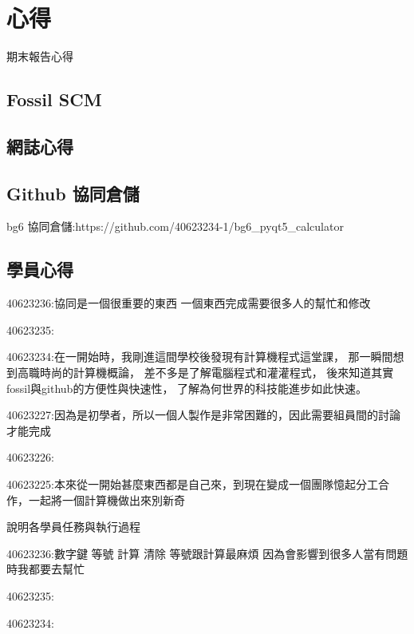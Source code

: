 \documentclass[12pt,,]{report}
\begin{document}
\hypertarget{ux5fc3ux5f97}{%
\chapter{心得}\label{ux5fc3ux5f97}}

期末報告心得

\hypertarget{fossil-scm}{%
\section{Fossil SCM}\label{fossil-scm}}

\hypertarget{ux7db2ux8a8cux5fc3ux5f97}{%
\section{網誌心得}\label{ux7db2ux8a8cux5fc3ux5f97}}

\hypertarget{github-ux5354ux540cux5009ux5132}{%
\section{Github 協同倉儲}\label{github-ux5354ux540cux5009ux5132}}

bg6 協同倉儲:https://github.com/40623234-1/bg6\_pyqt5\_calculator

\hypertarget{ux5b78ux54e1ux5fc3ux5f97}{%
\section{學員心得}\label{ux5b78ux54e1ux5fc3ux5f97}}

40623236:協同是一個很重要的東西 一個東西完成需要很多人的幫忙和修改

40623235:

40623234:在一開始時，我剛進這間學校後發現有計算機程式這堂課，
那一瞬間想到高職時尚的計算機概論， 差不多是了解電腦程式和灌灌程式，
後來知道其實fossil與github的方便性與快速性，
了解為何世界的科技能進步如此快速。

40623227:因為是初學者，所以一個人製作是非常困難的，因此需要組員間的討論才能完成

40623226:

40623225:本來從一開始甚麼東西都是自己來，到現在變成一個團隊憶起分工合作，一起將一個計算機做出來別新奇

說明各學員任務與執行過程

40623236:數字鍵 等號 計算 清除 等號跟計算最麻煩
因為會影響到很多人當有問題時我都要去幫忙

40623235:

40623234:
\end{document}
